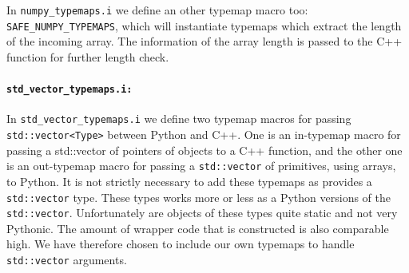 In \texttt{numpy\_typemaps.i} we define an other typemap macro too: \texttt{SAFE\_}\-\texttt{NUMPY\_}\-\texttt{TYPEMAPS}, which will instantiate typemaps which extract the length of the incoming \numpy array. The information of the array length is passed to the C++ function for further length check.\par

\paragraph{\texttt{std\_vector\_typemaps.i:}}
In \texttt{std\_vector\_typemaps.i} we define two typemap macros for passing \texttt{std::}\-\texttt{vector<Type>} between Python and C++. One is an in-typemap macro for passing a std::vector of pointers of \dolfin objects to a C++ function, and the other one is an out-typemap macro for passing a \texttt{std::vector} of primitives, using \numpy arrays, to Python. It is not strictly necessary to add these typemaps as \swig provides a \texttt{std::vector} type. These types works more or less as a Python versions of the \texttt{std::vector}. Unfortunately are objects of these types quite static and not very Pythonic. The amount of wrapper code that is constructed is also comparable high. We have therefore chosen to include our own typemaps to handle \texttt{std::vector} arguments.\par

